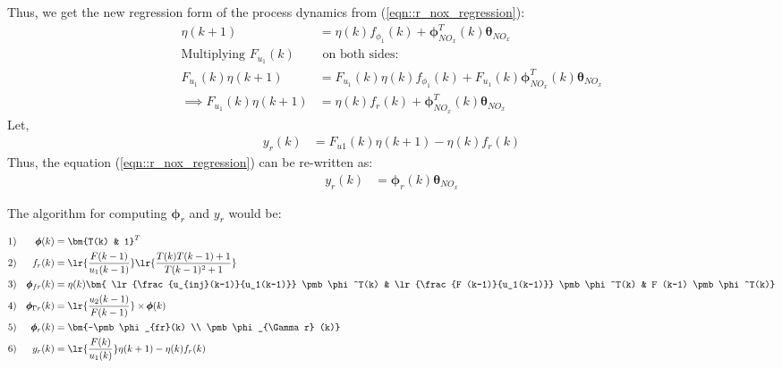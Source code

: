 Thus, we get the new regression form of the process dynamics from (\ref{eqn::r_nox_regression}):
\begin{align*}
        \eta (k+1) &=  \eta(k) f_{\phi_1}(k) +
                     \pmb \phi_{NO_x}^T (k) \pmb \theta_{NO_x}\\
        \text{Multiplying } F_{u_1}(k) & \text{ on both sides:}\\
        F_{u_1}(k) \eta (k+1) &=  F_{u_1}(k) \eta(k) f_{\phi_1}(k) +
                                        F_{u_1}(k) \pmb \phi_{NO_x}^T (k) \pmb \theta_{NO_x}\\
        \implies  F_{u_1}(k) \eta (k+1) &= \eta(k) f_r (k) + \pmb \phi_{NO_x}^T (k) \pmb \theta_{NO_x}
\end{align*}
Let,
\begin{align}
       y_r(k) &= F_{u1}(k) \eta (k+1) - \eta(k) f_r (k)
\end{align}
Thus, the equation (\ref{eqn::r_nox_regression}) can be re-written as:
\begin{align}
       y_r(k) &= \pmb \phi_r(k) \pmb \theta_{NO_x}
\end{align}

The algorithm for computing $\pmb \phi_r$ and $y_r$ would be:

\begin{align*}
        1)&& \pmb \phi(k) &= \bm{T(k) & 1} ^T\\
        2)&& f_{r}(k) &= \lr{\frac{F(k-1)}{u_1(k-1)}} \lr{\frac{T(k)T(k-1) + 1}{T(k-1)^2 + 1}}\\
        3)&& \pmb \phi_{fr}(k) &= \eta(k)
                                        \bm{ \lr{\frac{u_{inj}(k-1)}{u_1(k-1)}} \pmb \phi^T(k)
                                              & \lr{\frac{F (k-1)}{u_1(k-1)}} \pmb \phi^T(k)
                                              & F (k-1) \pmb \phi^T(k)} \\
        4)&& \pmb \phi_{\Gamma r}(k) &= \lr{\frac{u_2(k-1)}{F(k-1)}} \times \pmb \phi(k) \\
        5)&& \pmb \phi_{r}(k) &= \bm{-\pmb \phi_{fr}(k) \\ \pmb \phi_{\Gamma r} (k)} \\
        6)&& y_{r}(k) &= \lr{\frac{F(k)}{u_1(k)}} \eta (k+1) - \eta(k) f_r (k)
\end{align*}

